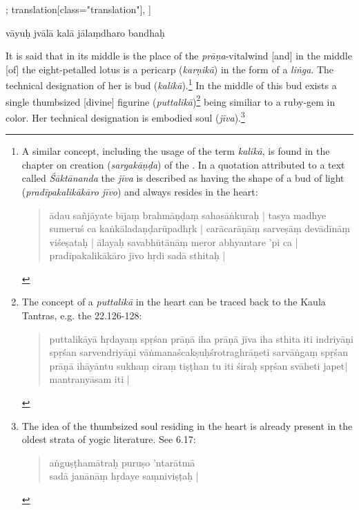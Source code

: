 \begin{alignment}[
   texts=edition[class="edition"];
    translation[class="translation"],
  ]
\begin{edition}
\begin{prose}
{         vāyuḥ\dd{}
        jvālā kalā\dd{}
        jālaṃdharo bandhaḥ\dd{}
        \dd{}
        \dd{}}
\end{prose}
\end{edition}
\begin{translation}
    \begin{tlate}
   It is said that in its middle is the place of the \textit{prāṇa}-vitalwind [and] in the middle [of] the eight-petalled lotus is a pericarp (\textit{karṇikā}) in the form of a \textit{liṅga}. The technical designation of her is bud (\textit{kalikā}).\footnote{A similar concept, including the usage of the term \textit{kalikā}, is found in the chapter on creation (\textit{sargakāṇḍa}) of the . In a quotation attributed to a text called \textit{Śāktānanda} the \textit{jīva} is described as having the shape of a bud of light (\textit{pradīpakalikākāro jīvo}) and always resides in the heart:
        \begin{quote} ādau sañjāyate bījaṃ brahmāṇḍaṃ sahasāṅkuraḥ | tasya madhye sumeruś ca kaṅkāladaṇḍarūpadhṛk | carācarāṇāṃ sarveṣāṃ devādīnāṃ viśeṣataḥ | ālayaḥ savabhūtānāṃ meror abhyantare 'pi ca | pradīpakalikākāro jīvo hṛdi sadā sthitaḥ |
        \end{quote}} In the middle of this bud exists a single thumbsized [divine] figurine (\textit{puttalikā})\footnote{The concept of a \textit{puttalikā} in the heart can be traced back to the Kaula Tantras, e.g. the  22.126-128: \begin{quote}  puttalikāyā hṛdayaṃ spṛśan prāṇā iha prāṇā jīva iha sthita iti indriyāṇi spṛśan sarvendriyāṇi vāṅmanaścakṣuḥśrotraghrāṇeti sarvāṅgaṃ spṛśan prāṇā ihāyāntu sukhaṃ ciraṃ tiṣṭhan tu iti śiraḥ spṛśan svāheti japet| mantranyāsam iti | \end{quote}} being similiar to a ruby-gem in color. Her technical designation is embodied soul (\textit{jīva}).\footnote{The idea of the thumbsized soul residing in the heart is already present in the oldest strata of yogic literature. See  6.17:
\begin{quote}
aṅguṣṭhamātraḥ puruṣo 'ntarātmā\\
    sadā janānāṃ hṛdaye saṃniviṣṭaḥ |\\

\end{quote}}
\end{tlate}
\end{translation}
\end{alignment}
